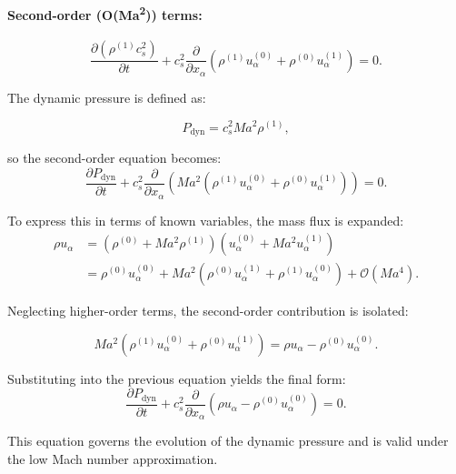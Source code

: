 \paragraph{Second-order (O(M\!a\textsuperscript{2})) terms:}
\begin{equation}
\frac{\partial (\rho^{(1)} c_s^2)}{\partial t} + c_s^2 \frac{\partial}{\partial x_\alpha}(\rho^{(1)} u_\alpha^{(0)} + \rho^{(0)} u_\alpha^{(1)}) = 0.
\end{equation}

The dynamic pressure is defined as:

\begin{equation}
P_{\text{dyn}} = c_s^2 M\!a^2 \rho^{(1)},
\end{equation}

so the second-order equation becomes:
\begin{equation}
\frac{\partial P_{\text{dyn}}}{\partial t} + c_s^2 \frac{\partial}{\partial x_\alpha} \left( M\!a^2 (\rho^{(1)} u_\alpha^{(0)} + \rho^{(0)} u_\alpha^{(1)}) \right) = 0.
\end{equation}

To express this in terms of known variables, the mass flux is expanded:
\begin{align*}
\rho u_\alpha &= (\rho^{(0)} + M\!a^2 \rho^{(1)})(u_\alpha^{(0)} + M\!a^2 u_\alpha^{(1)}) \\
&= \rho^{(0)} u_\alpha^{(0)} + M\!a^2(\rho^{(0)} u_\alpha^{(1)} + \rho^{(1)} u_\alpha^{(0)}) + \mathcal{O}(M\!a^4).
\end{align*}

Neglecting higher-order terms, the second-order contribution is isolated:

\begin{equation}
M\!a^2 (\rho^{(1)} u_\alpha^{(0)} + \rho^{(0)} u_\alpha^{(1)}) = \rho u_\alpha - \rho^{(0)} u_\alpha^{(0)}.
\end{equation}

Substituting into the previous equation yields the final form:
\begin{equation}
\frac{\partial P_{\text{dyn}}}{\partial t} + c_s^2 \frac{\partial}{\partial x_\alpha} \left( \rho u_\alpha - \rho^{(0)} u_\alpha^{(0)} \right) = 0.
\end{equation}

This equation governs the evolution of the dynamic pressure and is valid under the low Mach number approximation.
